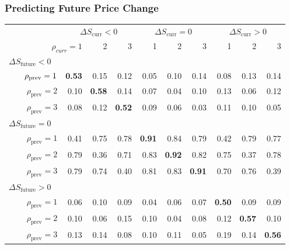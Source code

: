 \begin{frame}
\frametitle{Predicting Future Price Change}
\begin{table}%
\centering%
%
\begin{tabular}{@{} r@{\hskip 1cm} *{9}{r} @{}}%
\toprule
& \multicolumn{3}{c}{$\Delta S_\text{curr} < 0$} & \multicolumn{3}{c}{$\Delta S_\text{curr} = 0$} & \multicolumn{3}{c}{$\Delta S_\text{curr} > 0$} \\
\cmidrule(lr){2-4} \cmidrule(lr){5-7} \cmidrule(lr){8-10}
\multicolumn{2}{r}{$\rho_{curr} = 1$} & 2 & 3 & 1 & 2 & 3 & 1 & 2 & 3 \\
\midrule
\multicolumn{10}{l}{$\Delta S_\text{future} < 0$} \\
$\hphantom{abcd}\rho_\text{prev} = 1$ & \bf 0.53 & 0.15 & 0.12 & 0.05 & 0.10 & 0.14 & 0.08 & 0.13 & 0.14 \\
$\rho_\text{prev} = 2$ & 0.10 & \bf 0.58 & 0.14 & 0.07 & 0.04 & 0.10 & 0.13 & 0.06 & 0.12 \\
$\rho_\text{prev} = 3$ & 0.08 & 0.12 & \bf 0.52 & 0.09 & 0.06 & 0.03 & 0.11 & 0.10 & 0.05 \\[0.6ex]
\multicolumn{10}{l}{$\Delta S_\text{future} = 0$} \\
$\rho_\text{prev} = 1$ & 0.41 & 0.75 & 0.78 & \bf 0.91 & 0.84 & 0.79 & 0.42 & 0.79 & 0.77 \\
$\rho_\text{prev} = 2$ & 0.79 & 0.36 & 0.71 & 0.83 & \bf 0.92 & 0.82 & 0.75 & 0.37 & 0.78 \\
$\rho_\text{prev} = 3$ & 0.79 & 0.74 & 0.40 & 0.81 & 0.83 & \bf 0.91 & 0.70 & 0.76 & 0.39 \\[0.6ex]
\multicolumn{10}{l}{$\Delta S_\text{future} > 0$} \\
$\rho_\text{prev} = 1$ & 0.06 & 0.10 & 0.09 & 0.04 & 0.06 & 0.07 & \bf 0.50 & 0.09 & 0.09 \\
$\rho_\text{prev} = 2$ & 0.10 & 0.06 & 0.15 & 0.10 & 0.04 & 0.08 & 0.12 & \bf 0.57 & 0.10 \\
$\rho_\text{prev} = 3$ & 0.13 & 0.14 & 0.08 & 0.10 & 0.11 & 0.05 & 0.19 & 0.14 & \bf 0.56 \\
\bottomrule
\end{tabular}%
\end{table}%
\end{frame}

